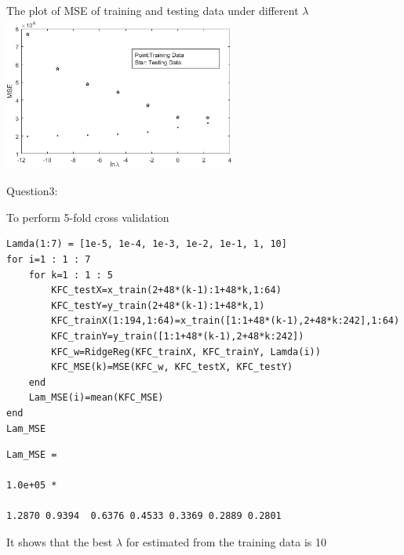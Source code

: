 \documentclass{sig-alternate}
\begin{document}
The plot of MSE of training and testing data under different $\lambda$\\
\includegraphics [width=3in,height=2in] {errorcompare.png} \\
\begin{bf} Question3:\end{bf}
To perform 5-fold cross validation
\begin{lstlisting}
Lamda(1:7) = [1e-5, 1e-4, 1e-3, 1e-2, 1e-1, 1, 10]
for i=1 : 1 : 7
	for k=1 : 1 : 5
		KFC_testX=x_train(2+48*(k-1):1+48*k,1:64)
		KFC_testY=y_train(2+48*(k-1):1+48*k,1)
		KFC_trainX(1:194,1:64)=x_train([1:1+48*(k-1),2+48*k:242],1:64)
		KFC_trainY=y_train([1:1+48*(k-1),2+48*k:242])
		KFC_w=RidgeReg(KFC_trainX, KFC_trainY, Lamda(i))
		KFC_MSE(k)=MSE(KFC_w, KFC_testX, KFC_testY)
	end
	Lam_MSE(i)=mean(KFC_MSE)
end
Lam_MSE
\end{lstlisting}
\begin{verbatim}
Lam_MSE =

1.0e+05 *

1.2870 0.9394  0.6376 0.4533 0.3369 0.2889 0.2801
\end{verbatim}
It shows that the best $\lambda$ for estimated from the training data is 10
\end{document}
